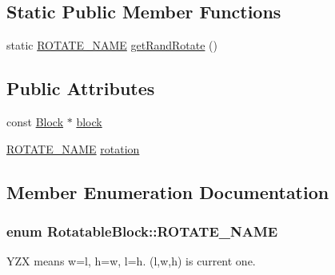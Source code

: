 \subsection*{Static Public Member Functions}
\begin{DoxyCompactItemize}
\item 
static \hyperlink{structRotatableBlock_ac076f0b2a72673cd4a5da5ea53b2e465}{R\+O\+T\+A\+T\+E\+\_\+\+N\+A\+M\+E} \hyperlink{structRotatableBlock_a15b7b0840be5cd6f10e4acd89131cb2b}{get\+Rand\+Rotate} ()
\end{DoxyCompactItemize}
\subsection*{Public Attributes}
\begin{DoxyCompactItemize}
\item 
const \hyperlink{structBlock}{Block} $\ast$ \hyperlink{structRotatableBlock_a7ad9b648924d8c37caa80f44841be4c7}{block}
\item 
\hyperlink{structRotatableBlock_ac076f0b2a72673cd4a5da5ea53b2e465}{R\+O\+T\+A\+T\+E\+\_\+\+N\+A\+M\+E} \hyperlink{structRotatableBlock_a6aa97c762ffc8ad401459003a63e6cc0}{rotation}
\end{DoxyCompactItemize}


\subsection{Member Enumeration Documentation}
\hypertarget{structRotatableBlock_ac076f0b2a72673cd4a5da5ea53b2e465}{}
\subsubsection[{R\+O\+T\+A\+T\+E\+\_\+\+N\+A\+M\+E}]{\setlength{\rightskip}{0pt plus 5cm}enum {\bf Rotatable\+Block\+::\+R\+O\+T\+A\+T\+E\+\_\+\+N\+A\+M\+E}}\label{structRotatableBlock_ac076f0b2a72673cd4a5da5ea53b2e465}


Y\+Z\+X means w\textquotesingle{}=l, h\textquotesingle{}=w, l\textquotesingle{}=h. (l\textquotesingle{},w\textquotesingle{},h\textquotesingle{}) is current one. 

